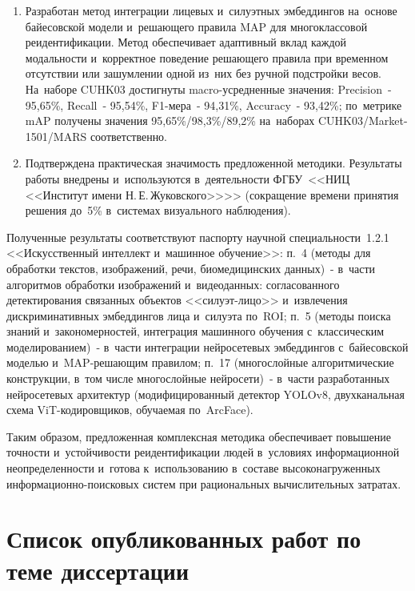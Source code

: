 \begin{enumerate}
    \item Разработан метод интеграции лицевых и~силуэтных эмбеддингов
    на~основе байесовской модели и~решающего правила MAP для многоклассовой
    реидентификации. Метод обеспечивает адаптивный вклад каждой модальности
    и~корректное поведение решающего правила при временном отсутствии
    или зашумлении одной из~них без ручной подстройки весов.
    На~наборе CUHK03
    достигнуты macro-усредненные значения: Precision~- 95,65\%,
    Recall~- 95,54\%, F1-мера~- 94,31\%, Accuracy~- 93,42\%; по~метрике
    mAP получены значения 95,65\%/98,3\%/89,2\% на~наборах
    CUHK03/Market-1501/MARS соответственно.

    \item Подтверждена практическая значимость предложенной методики.
    Результаты работы внедрены и~используются в~деятельности ФГБУ~<<НИЦ
    <<Институт имени Н.\,Е.\,Жуковского>>>> (сокращение времени принятия
    решения до~5\% в~системах визуального наблюдения).
\end{enumerate}

Полученные результаты соответствуют паспорту научной специальности~1.2.1
<<Искусственный интеллект и~машинное обучение>>:
п.~4 (методы для обработки текстов, изображений, речи, биомедицинских
данных)~- в~части алгоритмов обработки изображений и~видеоданных:
согласованного детектирования связанных объектов <<силуэт-лицо>>
и~извлечения дискриминативных эмбеддингов лица и~силуэта по~ROI;
п.~5 (методы поиска знаний и~закономерностей, интеграция машинного
обучения с~классическим моделированием)~- в~части интеграции нейросетевых
эмбеддингов с~байесовской моделью и~MAP-решающим правилом;
п.~17 (многослойные алгоритмические конструкции, в~том числе многослойные
нейросети)~- в~части разработанных нейросетевых архитектур
(модифицированный детектор YOLOv8, двухканальная схема ViT-кодировщиков,
обучаемая по~ArcFace).

Таким образом, предложенная комплексная методика обеспечивает повышение
точности и~устойчивости реидентификации людей в~условиях информационной
неопределенности и~готова к~использованию в~составе высоконагруженных
информационно-поисковых систем при рациональных вычислительных затратах.

\section*{Список опубликованных работ по теме диссертации}

